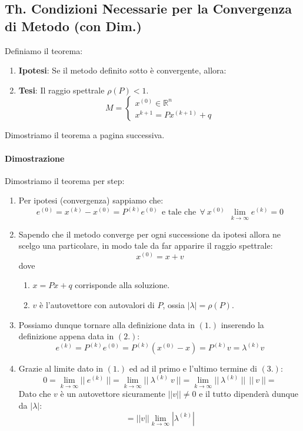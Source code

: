 \documentclass{article}
\begin{document}
\subsection{Th. Condizioni Necessarie per la Convergenza di Metodo (con Dim.)}

Definiamo il teorema:

\begin{enumerate}
    \item \textbf{Ipotesi}: Se il metodo definito sotto è convergente, allora:
    \item \textbf{Tesi}: Il raggio spettrale $\rho(P) < 1$.
    \vspace*{10px}
    \[ M = \left\{ \begin{array}{rcl}
        x^{(0)} \in \mathbb{R}^{n} \\ 
        x^{k+1} = Px^{(k+1)} + q 
        \end{array}\right.
         \]
\end{enumerate}

Dimostriamo il teorema a pagina successiva.

\newpage

\paragraph{Dimostrazione} Dimostriamo il teorema per step:

\begin{enumerate}
    \item Per ipotesi (convergenza) sappiamo che:
    \[ e^{(0)} = x^{(k)} - x^{(0)} = P^{(k)}e^{(0)} \:\: \text{e tale che} \:\: \forall \: x^{(0)} \: \: \lim_{k \rightarrow \infty} e^{(k)} = 0\]
    \item Sapendo che il metodo converge per ogni successione da ipotesi allora ne scelgo una particolare, in modo tale da far apparire il raggio spettrale:
    \[ x^{(0)} = x + v \]
    dove
    \begin{enumerate}
        \item $x = Px + q$ corrisponde alla soluzione.
        \item $v$ è l'autovettore con autovalori di $P$, ossia $|\lambda| = \rho(P)$.
    \end{enumerate}
    \item Possiamo dunque tornare alla definizione data in $(1.)$ inserendo la definizione appena data in $(2.)$:
    \[ e^{(k)} = P^{(k)}e^{(0)} = P^{(k)}(x^{(0)} - x) = P^{(k)}v = \lambda^{(k)}v \]
    \item Grazie al limite dato in $(1.)$ ed ad il primo e l'ultimo termine di $(3.)$:
    \[ 0 = \lim_{k \rightarrow \infty} ||\:e^{(k)}\:|| = \lim_{k \rightarrow \infty} ||\:\lambda^{(k)} \: v \:|| = \lim_{k \rightarrow \infty} ||\:\lambda^{(k)} \:||\:\:||\: v \:|| = \]
    Dato che $v$ è un autovettore sicuramente $||v|| \neq 0$ e il tutto dipenderà dunque da $|\lambda|$:
    \[ = ||v|| \lim_{k \rightarrow \infty} |\lambda^{(k)}| \]
\end{enumerate}
\end{document}
